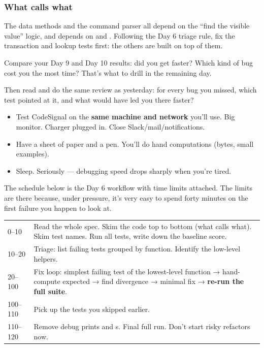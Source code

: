 \documentclass[10pt,a4paper]{article}
\begin{document}
\subsubsection{What calls what}
The data methods and the command parser all depend on the “find the visible value” logic, and  depends on  and . Following the Day 6 triage rule, fix the transaction and lookup tests first: the others are built on top of them.
\begin{keybox}
Compare your Day 9 and Day 10 results: did you get faster? Which kind of bug cost you the most time? That’s what to drill in the remaining day.
\end{keybox}
Then read  and do the same review as yesterday: for every bug you missed, which test pointed at it, and what would have led you there faster?
\begin{itemize}
\item Test CodeSignal on the \textbf{same machine and network} you’ll use. Big monitor. Charger plugged in. Close Slack/mail/notifications.
\item Have a sheet of paper and a pen. You’ll do hand computations (bytes, small examples).
\item Sleep. Seriously — debugging speed drops sharply when you’re tired.
\end{itemize}
The schedule below is the Day 6 workflow with time limits attached. The limits are there because, under pressure, it’s very easy to spend forty minutes on the first failure you happen to look at.
\begin{datatable}{}{\small}
\begin{xltabular}{\linewidth}{@{}Y{0.38}Y{1.62}@{}}
 &  \\ \hline
{}–10 & Read the whole spec. Skim the code top to bottom (what calls what). Skim test names. Run all tests, write down the baseline score. \\
10–20 & Triage: list failing tests grouped by function. Identify the low-level helpers. \\
20–100 & Fix loop: simplest failing test of the lowest-level function → hand-compute expected → find divergence → minimal fix → \textbf{re-run the full suite}. \\
100–110 & Pick up the tests you skipped earlier. \\
110–120 & Remove debug prints and s. Final full run. Don’t start risky refactors now. \\
\hline
\end{xltabular}
\end{datatable}
\end{document}
